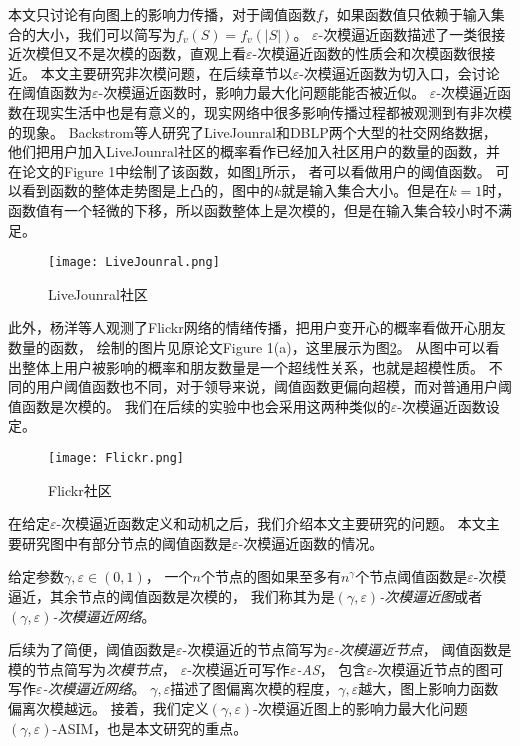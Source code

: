 本文只讨论有向图上的影响力传播，对于阈值函数$f$，如果函数值只依赖于输入集合的大小，我们可以简写为$f_v(S) = f_v(|S|)$。
$\varepsilon$-次模逼近函数描述了一类很接近次模但又不是次模的函数，直观上看$\varepsilon$-次模逼近函数的性质会和次模函数很接近。
本文主要研究非次模问题，在后续章节以$\varepsilon$-次模逼近函数为切入口，会讨论在阈值函数为$\varepsilon$-次模逼近函数时，影响力最大化问题能能否被近似。
$\varepsilon$-次模逼近函数在现实生活中也是有意义的，现实网络中很多影响传播过程都被观测到有非次模的现象。
Backstrom\cite{backstrom2006group}等人研究了LiveJounral和DBLP两个大型的社交网络数据，
他们把用户加入LiveJounral社区的概率看作已经加入社区用户的数量的函数，并在论文的Figure 1中绘制了该函数，如图\ref{fig:LiveJounral}所示，
者可以看做用户的阈值函数。
可以看到函数的整体走势图是上凸的，图中的$k$就是输入集合大小。但是在$k=1$时，函数值有一个轻微的下移，所以函数整体上是次模的，但是在输入集合较小时不满足。
\begin{figure}[h]
	\centering
	\texttt{[image: LiveJounral.png]}
	\caption{LiveJounral社区\cite{backstrom2006group}}\label{fig:LiveJounral}
\end{figure}
此外，杨洋\cite{yang2016role}等人观测了Flickr网络的情绪传播，把用户变开心的概率看做开心朋友数量的函数，
绘制的图片见原论文Figure 1(a)，这里展示为图\ref{fig:Flickr}。
从图中可以看出整体上用户被影响的概率和朋友数量是一个超线性关系，也就是超模性质。
不同的用户阈值函数也不同，对于领导来说，阈值函数更偏向超模，而对普通用户阈值函数是次模的。
我们在后续的实验中也会采用这两种类似的$\varepsilon$-次模逼近函数设定。
\begin{figure}[h]
	\centering
	\texttt{[image: Flickr.png]}
	\caption{Flickr社区\cite{yang2016role}}\label{fig:Flickr}
\end{figure}

在给定$\varepsilon$-次模逼近函数定义和动机之后，我们介绍本文主要研究的问题。
本文主要研究图中有部分节点的阈值函数是$\varepsilon$-次模逼近函数的情况。
\begin{definition}
给定参数$\gamma, \varepsilon \in (0,1)$，
一个$n$个节点的图如果至多有$n^{\gamma}$个节点阈值函数是$\varepsilon$-次模逼近，其余节点的阈值函数是次模的，
我们称其为是{\it $(\gamma,\varepsilon)$-次模逼近图}或者{\it $(\gamma,\varepsilon)$-次模逼近网络}。
\end{definition}
后续为了简便，阈值函数是$\varepsilon$-次模逼近的节点简写为{\it $\varepsilon$-次模逼近节点}，
阈值函数是模的节点简写为{\it 次模节点}，
$\varepsilon$-次模逼近可写作{\it $\varepsilon$-AS}，
包含$\varepsilon$-次模逼近节点的图可写作{\it $\varepsilon$-次模逼近网络}。
$\gamma, \varepsilon$描述了图偏离次模的程度，$\gamma, \varepsilon$越大，图上影响力函数偏离次模越远。
接着，我们定义$(\gamma,\varepsilon)$-次模逼近图上的影响力最大化问题$(\gamma,\varepsilon)$-ASIM，也是本文研究的重点。

